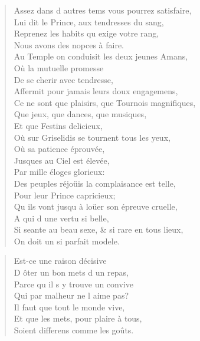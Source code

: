 \begin{verse}
Assez dans d\textquotesingle{} autres tems vous pourrez satisfaire, \\
\vin Lui dit le Prince, aux tendresses du sang, \\
Reprenez les habits qu\textquotesingle{} exige votre rang, \\
\vin Nous avons des nopces à faire. \\
Au Temple on conduisit les deux jeunes Amans, \\
\vin Où la mutuelle promesse \\
\vin De se cherir avec tendresse, \\
Affermit pour jamais leurs doux engagemens, \\
Ce ne sont que plaisirs, que Tournois magnifiques, \\
\vin Que jeux, que dances, que musiques, \\
\vin Et que Festins delicieux, \\
Où sur Griselidis se tournent tous les yeux, \\
\vin Où sa patience éprouvée, \\
\vin Jusques au Ciel est élevée, \\
\vin Par mille éloges glorieux: \\
Des peuples réjoüis la complaisance est telle, \\
\vin Pour leur Prince capricieux; \\
Qu\textquotesingle{} ils vont jusqu\textquotesingle{} à loüer son épreuve cruelle, \\
\vin A qui d\textquotesingle{} une vertu si belle, \\
Si seante au beau sexe, \& si rare en tous lieux, \\
\vin On doit un si parfait modele.
\end{verse}

\begin{verse}
Est-ce une raison décisive \\
D\textquotesingle{} ôter un bon mets d\textquotesingle{} un repas, \\
Parce qu\textquotesingle{} il s\textquotesingle{} y trouve un convive \\
Qui par malheur ne l\textquotesingle{} aime pas? \\
Il faut que tout le monde vive, \\
Et que les mets, pour plaire à tous, \\
Soient differens comme les goûts.
\end{verse}
